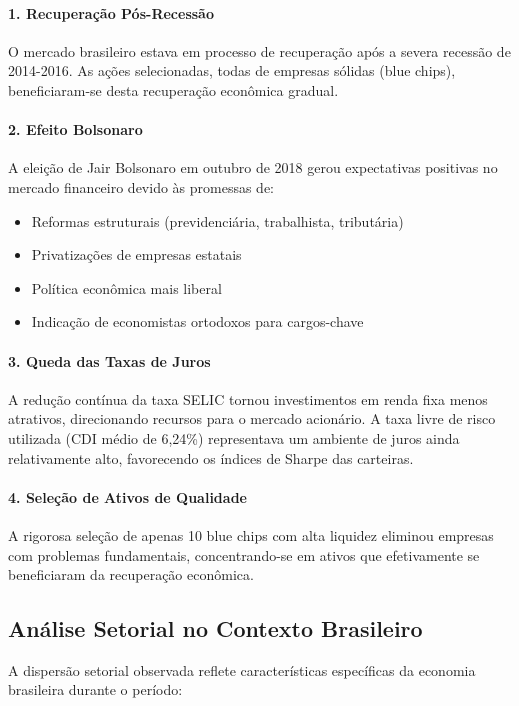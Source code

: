 \paragraph{1. Recuperação Pós-Recessão}
O mercado brasileiro estava em processo de recuperação após a severa recessão de 2014-2016. As ações selecionadas, todas de empresas sólidas (blue chips), beneficiaram-se desta recuperação econômica gradual.

\paragraph{2. Efeito Bolsonaro}
A eleição de Jair Bolsonaro em outubro de 2018 gerou expectativas positivas no mercado financeiro devido às promessas de:
\begin{itemize}
    \item Reformas estruturais (previdenciária, trabalhista, tributária)
    \item Privatizações de empresas estatais
    \item Política econômica mais liberal
    \item Indicação de economistas ortodoxos para cargos-chave
\end{itemize}

\paragraph{3. Queda das Taxas de Juros}
A redução contínua da taxa SELIC tornou investimentos em renda fixa menos atrativos, direcionando recursos para o mercado acionário. A taxa livre de risco utilizada (CDI médio de 6,24\%) representava um ambiente de juros ainda relativamente alto, favorecendo os índices de Sharpe das carteiras.

\paragraph{4. Seleção de Ativos de Qualidade}
A rigorosa seleção de apenas 10 blue chips com alta liquidez eliminou empresas com problemas fundamentais, concentrando-se em ativos que efetivamente se beneficiaram da recuperação econômica.

\subsection{Análise Setorial no Contexto Brasileiro}

A dispersão setorial observada reflete características específicas da economia brasileira durante o período:

